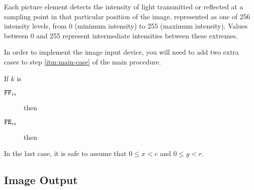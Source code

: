 \documentclass[a4paper,12pt]{article}
\newcommand{\num}[1]{\texttt{#1}}
\newcommand{\hex}[1]{\num{#1}_{\textup{\tiny 16}}}
\newcommand{\proc}[1]{\textsc{#1}}
\newcommand{\deviceio}[1]{$\langle$#1$\rangle$}
\newcommand{\op}[1]{$#1$}
\theoremstyle{definition}
\newcommand{\READPIXEL} [1]{\op{\hex{FE}}}
\newcommand{\READFRAME} [1]{\op{\hex{FF}}}
\begin{document}
Each picture element detects the intensity of light transmitted or reflected at a sampling point in that particular position of the image, represented as one of 256 intensity levels, from 0 (minimum intensity) to 255 (maximum intensity).
Values between 0 and 255 represent intermediate intensities between these extremes.

In order to implement the image input device, you will need to add two extra cases to step \ref{itm:main-case} of the main procedure.

\begin{stepnumbers}[start=3]
\item If $k$ is
  \begin{description}
  \item[\READFRAME{}] then
  \item[\READPIXEL{}] then
  \end{description}
\end{stepnumbers}
In the last case, it is safe to assume that $0 \le x < c$ and $0 \le y < r$.

\subsection{Image Output}
\end{document}
